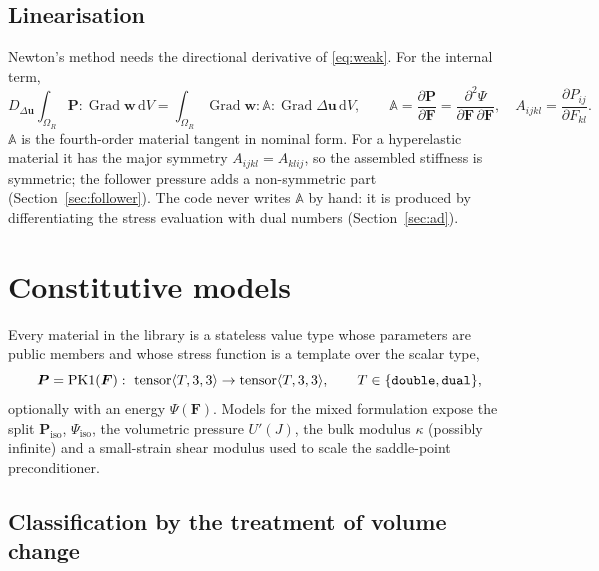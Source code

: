 \documentclass[11pt]{article}
\newcommand{\ud}{\,\mathrm{d}}
\newcommand{\Grad}{\operatorname{Grad}}
\newcommand{\bu}{\bm{u}}
\newcommand{\bw}{\bm{w}}
\newcommand{\bP}{\bm{P}}
\newcommand{\bF}{\bm{F}}
\newcommand{\bA}{\mathbb{A}}
\DeclareRobustCommand{\code}[1]{{\def\_{\textunderscore\allowbreak}\texttt{#1}}}
\begin{document}
\subsection{Linearisation}

Newton's method needs the directional derivative of \eqref{eq:weak}.  For
the internal term,
\begin{equation}
  D_{\Delta\bu}\int_{\Omega_R}\bP:\Grad\bw\ud V
  = \int_{\Omega_R}\Grad\bw:\bA:\Grad\Delta\bu\ud V,
  \qquad
  \bA = \frac{\partial\bP}{\partial\bF}
      = \frac{\partial^2\Psi}{\partial\bF\,\partial\bF},
  \quad A_{ijkl} = \frac{\partial P_{ij}}{\partial F_{kl}} .
  \label{eq:tangent}
\end{equation}
$\bA$ is the fourth-order material tangent in nominal form.  For a
hyperelastic material it has the major symmetry $A_{ijkl} = A_{klij}$, so
the assembled stiffness is symmetric; the follower pressure adds a
non-symmetric part (Section~\ref{sec:follower}).  The code never writes
$\bA$ by hand: it is produced by differentiating the stress evaluation with
dual numbers (Section~\ref{sec:ad}).

\section{Constitutive models}
\label{sec:materials}

Every material in the library is a stateless value type whose parameters
are public members and whose stress function is a template over the scalar
type,
\begin{equation}
  \bP = \mathrm{PK1}(\bF): \ \text{tensor}\langle T, 3, 3\rangle \to
  \text{tensor}\langle T, 3, 3\rangle, \qquad T \in \{\code{double}, \code{dual}\},
\end{equation}
optionally with an energy $\Psi(\bF)$.  Models for the mixed formulation
expose the split $\bP_{\mathrm{iso}}$, $\Psi_{\mathrm{iso}}$, the
volumetric pressure $U'(J)$, the bulk modulus $\kappa$ (possibly infinite)
and a small-strain shear modulus used to scale the saddle-point
preconditioner.

\subsection{Classification by the treatment of volume change}
\label{sec:classification}
\end{document}
